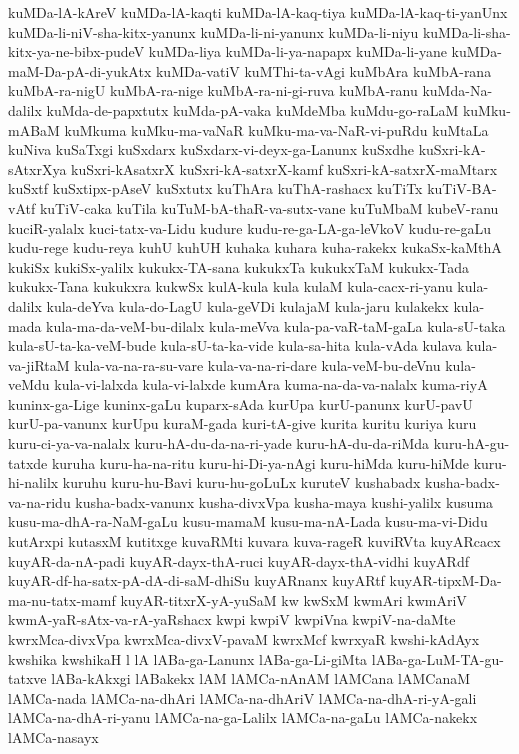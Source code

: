 {kuMDa-lA-kAreV
kuMDa-lA-kaqti
kuMDa-lA-kaq-tiya
kuMDa-lA-kaq-ti-yanUnx
kuMDa-li-niV-sha-kitx-yanunx
kuMDa-li-ni-yanunx
kuMDa-li-niyu
kuMDa-li-sha-kitx-ya-ne-bibx-pudeV
kuMDa-liya
kuMDa-li-ya-napapx
kuMDa-li-yane
kuMDa-maM-Da-pA-di-yukAtx
kuMDa-vatiV
kuMThi-ta-vAgi
kuMbAra
kuMbA-rana
kuMbA-ra-nigU
kuMbA-ra-nige
kuMbA-ra-ni-gi-ruva
kuMbA-ranu
kuMda-Na-dalilx
kuMda-de-papxtutx
kuMda-pA-vaka
kuMdeMba
kuMdu-go-raLaM
kuMku-mABaM
kuMkuma
kuMku-ma-vaNaR
kuMku-ma-va-NaR-vi-puRdu
kuMtaLa
kuNiva
kuSaTxgi
kuSxdarx
kuSxdarx-vi-deyx-ga-Lanunx
kuSxdhe
kuSxri-kA-sAtxrXya
kuSxri-kAsatxrX
kuSxri-kA-satxrX-kamf
kuSxri-kA-satxrX-maMtarx
kuSxtf
kuSxtipx-pAseV
kuSxtutx
kuThAra
kuThA-rashacx
kuTiTx
kuTiV-BA-vAtf
kuTiV-caka
kuTila
kuTuM-bA-thaR-va-sutx-vane
kuTuMbaM
kubeV-ranu
kuciR-yalalx
kuci-tatx-va-Lidu
kudure
kudu-re-ga-LA-ga-leVkoV
kudu-re-gaLu
kudu-rege
kudu-reya
kuhU
kuhUH
kuhaka
kuhara
kuha-rakekx
kukaSx-kaMthA
kukiSx
kukiSx-yalilx
kukukx-TA-sana
kukukxTa
kukukxTaM
kukukx-Tada
kukukx-Tana
kukukxra
kukwSx
kulA-kula
kula
kulaM
kula-cacx-ri-yanu
kula-dalilx
kula-deYva
kula-do-LagU
kula-geVDi
kulajaM
kula-jaru
kulakekx
kula-mada
kula-ma-da-veM-bu-dilalx
kula-meVva
kula-pa-vaR-taM-gaLa
kula-sU-taka
kula-sU-ta-ka-veM-bude
kula-sU-ta-ka-vide
kula-sa-hita
kula-vAda
kulava
kula-va-jiRtaM
kula-va-na-ra-su-vare
kula-va-na-ri-dare
kula-veM-bu-deVnu
kula-veMdu
kula-vi-lalxda
kula-vi-lalxde
kumAra
kuma-na-da-va-nalalx
kuma-riyA
kuninx-ga-Lige
kuninx-gaLu
kuparx-sAda
kurUpa
kurU-panunx
kurU-pavU
kurU-pa-vanunx
kurUpu
kuraM-gada
kuri-tA-give
kurita
kuritu
kuriya
kuru
kuru-ci-ya-va-nalalx
kuru-hA-du-da-na-ri-yade
kuru-hA-du-da-riMda
kuru-hA-gu-tatxde
kuruha
kuru-ha-na-ritu
kuru-hi-Di-ya-nAgi
kuru-hiMda
kuru-hiMde
kuru-hi-nalilx
kuruhu
kuru-hu-Bavi
kuru-hu-goLuLx
kuruteV
kushabadx
kusha-badx-va-na-ridu
kusha-badx-vanunx
kusha-divxVpa
kusha-maya
kushi-yalilx
kusuma
kusu-ma-dhA-ra-NaM-gaLu
kusu-mamaM
kusu-ma-nA-Lada
kusu-ma-vi-Didu
kutArxpi
kutasxM
kutitxge
kuvaRMti
kuvara
kuva-rageR
kuviRVta
kuyARcacx
kuyAR-da-nA-padi
kuyAR-dayx-thA-ruci
kuyAR-dayx-thA-vidhi
kuyARdf
kuyAR-df-ha-satx-pA-dA-di-saM-dhiSu
kuyARnanx
kuyARtf
kuyAR-tipxM-Da-ma-nu-tatx-mamf
kuyAR-titxrX-yA-yuSaM
kw
kwSxM
kwmAri
kwmAriV
kwmA-yaR-sAtx-va-rA-yaRshacx
kwpi
kwpiV
kwpiVna
kwpiV-na-daMte
kwrxMca-divxVpa
kwrxMca-divxV-pavaM
kwrxMcf
kwrxyaR
kwshi-kAdAyx
kwshika
kwshikaH
l
lA
lABa-ga-Lanunx
lABa-ga-Li-giMta
lABa-ga-LuM-TA-gu-tatxve
lABa-kAkxgi
lABakekx
lAM
lAMCa-nAnAM
lAMCana
lAMCanaM
lAMCa-nada
lAMCa-na-dhAri
lAMCa-na-dhAriV
lAMCa-na-dhA-ri-yA-gali
lAMCa-na-dhA-ri-yanu
lAMCa-na-ga-Lalilx
lAMCa-na-gaLu
lAMCa-nakekx
lAMCa-nasayx
}
